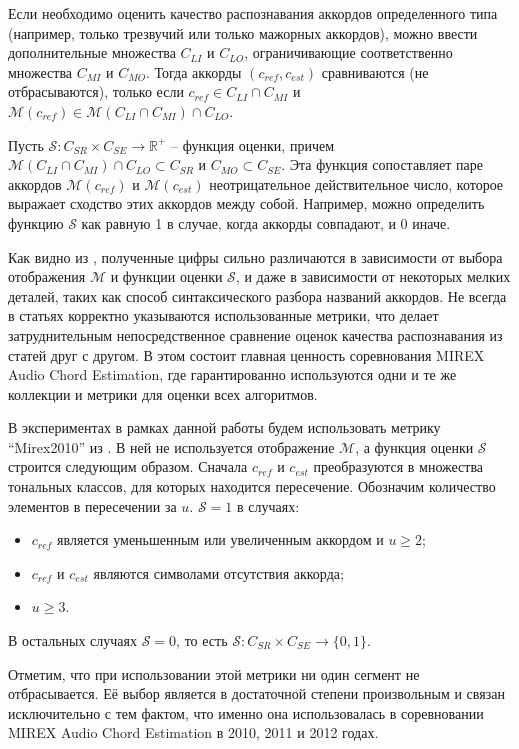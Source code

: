 Если необходимо оценить качество распознавания аккордов определенного типа
(например, только трезвучий или только мажорных аккордов), можно ввести
дополнительные множества $C_{LI}$ и $C_{LO}$, ограничивающие соответственно
множества $C_{MI}$ и $C_{MO}$. Тогда аккорды $(c_{ref}, c_{est})$ сравниваются
(не отбрасываются), только если $c_{ref} \in C_{LI} \cap C_{MI}$ и
$\mathcal{M}(c_{ref}) \in \mathcal{M}(C_{LI} \cap C_{MI}) \cap C_{LO}$.

Пусть $\mathcal{S}:C_{SR} \times C_{SE} \to \mathbb{R}^+$ -- функция оценки,
причем $\mathcal{M}(C_{LI} \cap C_{MI}) \cap C_{LO} \subset C_{SR}$ и $C_{MO}
\subset C_{SE}$. Эта функция сопоставляет паре аккордов $\mathcal{M}(c_{ref})$ и
$\mathcal{M}(c_{est})$ неотрицательное действительное число, которое выражает
сходство этих аккордов между собой. Например, можно определить функцию
$\mathcal{S}$ как равную 1 в случае, когда аккорды совпадают, и 0 иначе.

Как видно из \cite{Pauwels2013}, полученные цифры сильно различаются в
зависимости от выбора отображения $\mathcal{M}$ и функции оценки $\mathcal{S}$,
и даже в зависимости от некоторых мелких деталей, таких как способ
синтаксического разбора названий аккордов. Не всегда в статьях корректно
указываются использованные метрики, что делает затруднительным непосредственное
сравнение оценок качества распознавания из статей друг с другом. В этом состоит
главная ценность соревнования MIREX Audio Chord Estimation, где гарантированно
используются одни и те же коллекции и метрики для оценки всех алгоритмов.

В экспериментах в рамках данной работы будем использовать метрику ``Mirex2010''
из \cite{Pauwels2013}. В ней не используется отображение $\mathcal{M}$, а
функция оценки $\mathcal{S}$ строится следующим образом. Сначала $c_{ref}$ и
$c_{est}$ преобразуются в множества тональных классов, для которых находится
пересечение. Обозначим количество элементов в пересечении за $u$.
$\mathcal{S}=1$ в случаях:
\begin{itemize}
  \item $c_{ref}$ является уменьшенным или увеличенным аккордом и $u \geq 2$;
  \item $c_{ref}$ и $c_{est}$ являются символами отсутствия аккорда;
  \item $u \geq 3$.
\end{itemize}
В остальных случаях $\mathcal{S}=0$, то есть $\mathcal{S}:C_{SR} \times C_{SE}
\to \{0, 1\}$. 

Отметим, что при использовании этой метрики ни один сегмент не
отбрасывается. Её выбор является в достаточной степени произвольным и связан
исключительно с тем фактом, что именно она использовалась в соревновании MIREX
Audio Chord Estimation в 2010, 2011 и 2012 годах.


